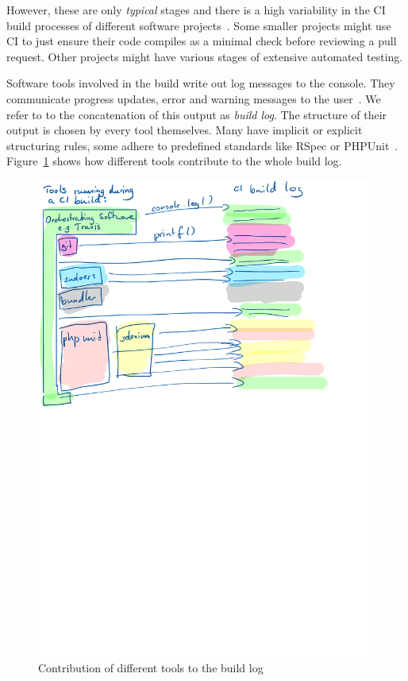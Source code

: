 \documentclass[\myrootdir/main.tex]{subfiles}
\begin{document}
However, these are only \emph{typical} stages and there is a high variability in the CI build processes of different software projects~\cite{staahl2014modeling}.
Some smaller projects might use CI to just ensure their code compiles as a minimal check before reviewing a pull request.
Other projects might have various stages of extensive automated testing.

Software tools involved in the build write out log messages to the console.
They communicate progress updates, error and warning messages to the user~\cite{yuan2012characterizing}.
We refer to to the concatenation of this output as \emph{build log}.
The structure of their output is chosen by every tool themselves.
Many have implicit or explicit structuring rules, some adhere to predefined standards like RSpec or PHPUnit~\cite{phpunit2019logging,rspec2019format}.
Figure~\ref{fig:tool-log-contribution} shows how different tools contribute to the whole build log.

\begin{figure}[htbp]
	\centering
	\includegraphics[width=\textwidth, trim={0cm 15cm 0cm 0cm}, clip]{img/tool-log-contribution.pdf}
	\caption{Contribution of different tools to the build log}
	\label{fig:tool-log-contribution}
\end{figure}
\end{document}
